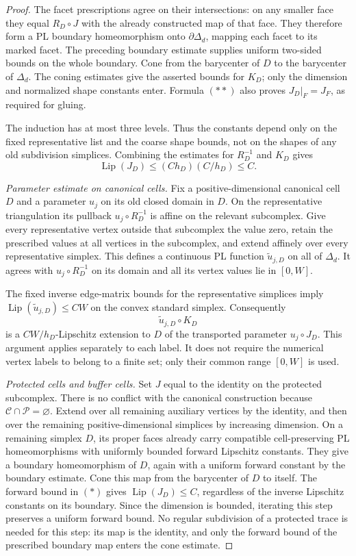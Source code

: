 \documentclass[11pt]{article}
\numberwithin{equation}{section}
\theoremstyle{definition}
\theoremstyle{remark}
\DeclareMathOperator{\Lip}{Lip}
\begin{document}
\begin{proof}
The facet prescriptions agree on their intersections: on any
smaller face they equal $R_D\circ J$ with the already constructed
map of that face.  They therefore form a PL boundary homeomorphism
onto $\partial\Delta_d$, mapping each facet to its marked facet.
The preceding boundary estimate supplies uniform two-sided bounds
on the whole boundary.  Cone from the barycenter of $D$ to the
barycenter of $\Delta_d$.  The coning estimates give the asserted
bounds for $K_D$; only the dimension and normalized shape constants
enter.  Formula $(**)$ also proves
$J_D|_F=J_F$, as required for gluing.

The induction has at most three levels.  Thus the constants depend
only on the fixed representative list and the coarse shape bounds,
not on the shapes of any old subdivision simplices.  Combining
the estimates for $R_D^{-1}$ and $K_D$ gives
\[
 \Lip(J_D)\leq (C h_D)(C/h_D)\leq C.
\]

\emph{Parameter estimate on canonical cells.}
Fix a positive-dimensional canonical cell $D$ and a parameter $u_j$
on its old closed domain in $D$.  On the
representative triangulation its pullback $u_j\circ R_D^{-1}$
is affine on the relevant subcomplex.  Give every representative
vertex outside that subcomplex the value zero, retain the
prescribed values at all vertices in the subcomplex, and extend
affinely over every representative simplex.  This defines a
continuous PL function $\widetilde u_{j,D}$ on all of $\Delta_d$.
It agrees with $u_j\circ R_D^{-1}$ on its domain and all its vertex
values lie in $[0,W]$.

The fixed inverse edge-matrix bounds for the representative
simplices imply
$\Lip(\widetilde u_{j,D})\leq C W$ on the convex standard simplex.
Consequently
\[
 \widetilde u_{j,D}\circ K_D
\]
is a $C W/h_D$-Lipschitz extension to $D$ of the transported
parameter $u_j\circ J_D$.  This argument applies separately to
each label.  It does not require the numerical vertex labels to
belong to a finite set; only their common range $[0,W]$ is used.

\emph{Protected cells and buffer cells.}
Set $J$ equal to the identity on the protected subcomplex.
There is no conflict with the canonical construction because
$\mathcal C\cap\mathcal P=\varnothing$.  Extend over all remaining
auxiliary vertices by the identity, and then over the remaining
positive-dimensional simplices by increasing dimension.  On a remaining
simplex $D$, its proper faces already carry compatible
cell-preserving PL homeomorphisms with uniformly bounded forward
Lipschitz constants.  They give a boundary homeomorphism of $D$,
again with a uniform forward constant by the boundary estimate.
Cone this map from the barycenter of $D$ to itself.  The forward
bound in $(*)$ gives $\Lip(J_D)\leq C$, regardless of the inverse
Lipschitz constants on its boundary.  Since the dimension is
bounded, iterating this step preserves a uniform forward bound.
No regular subdivision of a protected trace is needed for this
step: its map is the identity, and only the forward bound of the
prescribed boundary map enters the cone estimate.


\end{proof}
\end{document}

